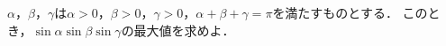 \documentclass[../../main.tex]{subfiles}
\begin{document}
$\alpha$，$\beta$，$\gamma$は$\alpha>0$，$\beta>0$，$\gamma>0$，$\alpha+\beta+\gamma=\pi$を満たすものとする．
このとき，$\sin\alpha\sin\beta\sin\gamma$の最大値を求めよ．
\end{document}

